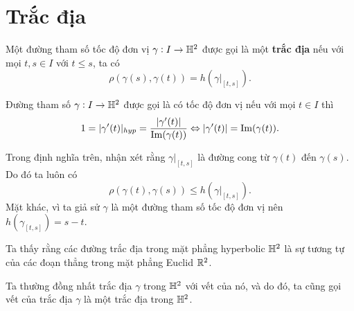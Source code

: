 
\section{Trắc địa}
\begin{defn}
    Một đường tham số tốc độ đơn vị $\gamma: I\to \mathbb{H}^2$ được gọi là một \textbf{trắc địa} nếu với mọi $t,s \in I$ với $t\leq s$, ta có
    \[\rho(\gamma(s),\gamma(t)) = h(\gamma|_{[t,s]}).\]
\end{defn}
\begin{remark*}
    Đường tham số $\gamma: I\to \mathbb{H}^2$ được gọi là có tốc độ đơn vị
    nếu với mọi $t\in I$ thì \[1 = |\gamma'(t)|_{hyp} = \dfrac{|\gamma'(t)|}{\operatorname{Im}(\gamma(t))} \Leftrightarrow |\gamma'(t)| = \operatorname{Im}(\gamma(t)).\]
\end{remark*}
Trong định nghĩa trên, nhận xét rằng $\gamma|_{[t,s]}$ là đường cong từ $\gamma(t)$ đến $\gamma(s)$. Do đó ta luôn có 
\[\rho(\gamma(t),\gamma(s)) \leq h(\gamma|_{[t,s]}).\]
Mặt khác, vì ta giả sử $\gamma$ là một đường tham số tốc độ đơn vị nên $h(\gamma_{[t,s]}) = s-t$.

Ta thấy rằng các đường trắc địa trong mặt phẳng hyperbolic $\mathbb{H}^2$ là sự tương tự của các đoạn thẳng trong mặt phẳng Euclid $\mathbb{R}^2$.

Ta thường đồng nhất trắc địa $\gamma$ trong $\mathbb{H}^2$ với vết của nó, và do đó, ta cũng gọi vết của trắc địa $\gamma$ là một trắc địa trong $\mathbb{H}^2$.

